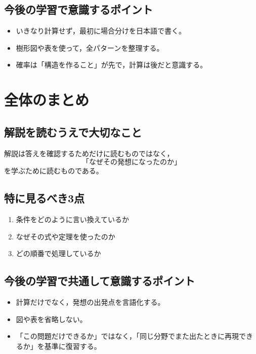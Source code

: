 \subsection*{今後の学習で意識するポイント}
\begin{itemize}
  \item いきなり計算せず，最初に場合分けを日本語で書く。
  \item 樹形図や表を使って，全パターンを整理する。
  \item 確率は「構造を作ること」が先で，計算は後だと意識する。
\end{itemize}

\bigskip

\section*{全体のまとめ}

\subsection*{解説を読むうえで大切なこと}
解説は答えを確認するためだけに読むものではなく，
\[
\text{「なぜその発想になったのか」}
\]
を学ぶために読むものである。

\subsection*{特に見るべき3点}
\begin{enumerate}
  \item 条件をどのように言い換えているか
  \item なぜその式や定理を使ったのか
  \item どの順番で処理しているか
\end{enumerate}

\subsection*{今後の学習で共通して意識するポイント}
\begin{itemize}
  \item 計算だけでなく，発想の出発点を言語化する。
  \item 図や表を省略しない。
  \item 「この問題だけできるか」ではなく，「同じ分野でまた出たときに再現できるか」を基準に復習する。
\end{itemize}
